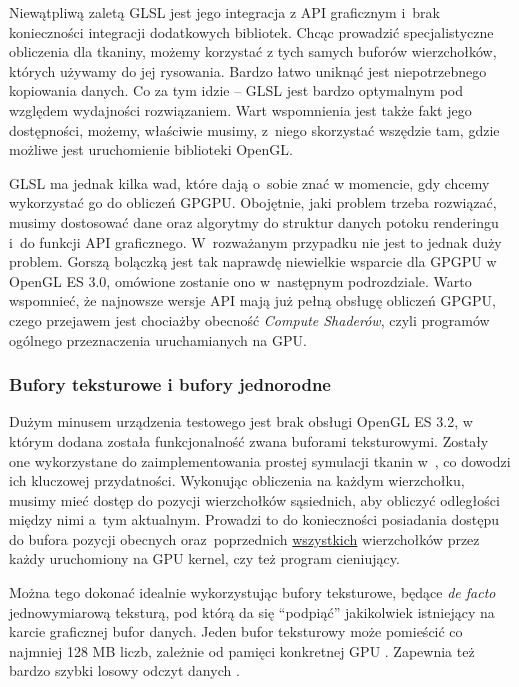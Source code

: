 			Niewątpliwą zaletą GLSL jest jego integracja z API graficznym i~brak konieczności integracji dodatkowych bibliotek. Chcąc prowadzić specjalistyczne obliczenia dla tkaniny, możemy korzystać z tych samych buforów wierzchołków, których używamy do jej rysowania. Bardzo łatwo uniknąć jest niepotrzebnego kopiowania danych. Co za tym idzie -- GLSL jest bardzo optymalnym pod względem wydajności rozwiązaniem. Wart wspomnienia jest także fakt jego dostępności, możemy, właściwie musimy, z~niego skorzystać wszędzie tam, gdzie możliwe jest uruchomienie biblioteki OpenGL. 
			
			GLSL ma jednak kilka wad, które dają o~sobie znać w momencie, gdy chcemy wykorzystać go do obliczeń GPGPU. Obojętnie, jaki problem trzeba rozwiązać, musimy dostosować dane oraz algorytmy do struktur danych potoku renderingu i~do funkcji API graficznego. W~rozważanym przypadku nie jest to jednak duży problem. Gorszą bolączką jest tak naprawdę niewielkie wsparcie dla GPGPU w OpenGL ES 3.0, omówione zostanie ono w~następnym podrozdziale. Warto wspomnieć, że najnowsze wersje API mają już pełną obsługę obliczeń GPGPU, czego przejawem jest chociażby obecność \emph{Compute Shaderów}, czyli programów ogólnego przeznaczenia uruchamianych na GPU.
			
			\subsubsection{Bufory teksturowe i bufory jednorodne}
			\label{t:technologie:narzedzia:bufory}
			
			Dużym minusem urządzenia testowego jest brak obsługi OpenGL ES 3.2, w którym dodana została funkcjonalność zwana buforami teksturowymi. Zostały one wykorzystane do zaimplementowania prostej symulacji tkanin w~\cite{receptury}, co dowodzi ich kluczowej przydatności. Wykonując obliczenia na każdym wierzchołku, musimy mieć dostęp do pozycji wierzchołków sąsiednich, aby obliczyć odległości między nimi a~tym aktualnym. Prowadzi to do konieczności posiadania dostępu do bufora pozycji obecnych oraz~poprzednich \uline{wszystkich} wierzchołków przez każdy uruchomiony na GPU kernel, czy też program cieniujący. 
			
			Można tego dokonać idealnie wykorzystując bufory teksturowe, będące \emph{de facto} jednowymiarową teksturą, pod którą da się ``podpiąć'' jakikolwiek istniejący na karcie graficznej bufor danych. Jeden bufor teksturowy może pomieścić co najmniej 128 MB liczb, zależnie od pamięci konkretnej GPU \cite{opengl_wiki}. Zapewnia też bardzo szybki losowy odczyt danych \cite{buffers}. 
			
